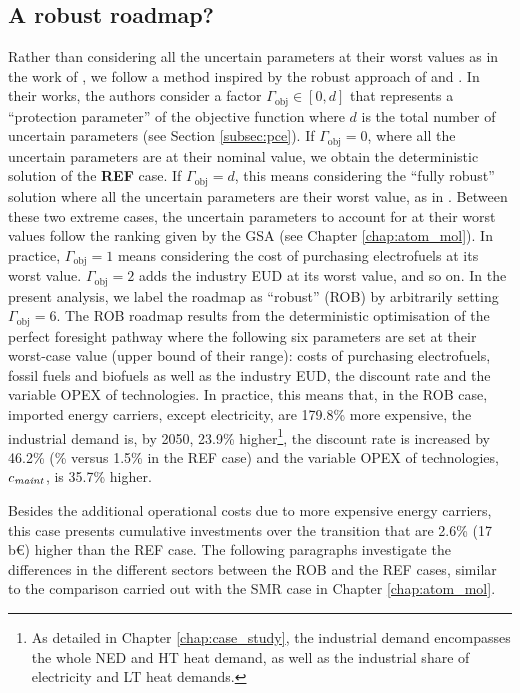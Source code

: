 \subsection{A robust roadmap?}
\label{subsec:RobPol:Rob_roadmap}
Rather than considering all the uncertain parameters at their worst values as in the work of \citet{soyster1973convex}, we follow a method inspired by the robust approach of \citet{bertsimas2004price} and \citet{Moret2017PhDThesis}. In their works, the authors consider a factor $\Gamma_{\text{obj}}\in [0,d]$ that represents a ``protection parameter'' of the objective function where $d$ is the total number of uncertain parameters (see Section \ref{subsec:pce}). If $\Gamma_{\text{obj}}= 0$, where all the uncertain parameters are at their nominal value, we obtain the deterministic solution of the \textbf{REF} case. If $\Gamma_{\text{obj}}= d$, this means considering the ``fully robust'' solution where all the uncertain parameters are their worst value, as in \citet{soyster1973convex}.  Between these two extreme cases, the uncertain parameters to account for at their worst values follow the ranking given by the \gls{GSA} (see Chapter \ref{chap:atom_mol}). In practice, $\Gamma_{\text{obj}}= 1$ means considering the cost of purchasing electrofuels at its worst value. $\Gamma_{\text{obj}}= 2$ adds the industry \gls{EUD} at its worst value, and so on. In the present analysis, we label the roadmap as ``robust'' (ROB) by arbitrarily setting $\Gamma_{\text{obj}}= 6$. The ROB roadmap results from the deterministic optimisation of the perfect foresight pathway where the following six parameters are set at their worst-case value (upper bound of their range): costs of purchasing electrofuels, fossil fuels and biofuels as well as the industry \gls{EUD}, the discount rate and the variable OPEX of technologies. In practice, this means that, in the ROB case, imported energy carriers, except electricity, are 179.8\% more expensive, the industrial demand is, by 2050, 23.9\% higher\footnote{As detailed in Chapter \ref{chap:case_study}, the industrial demand encompasses the whole \gls{NED} and \gls{HT} heat demand, as well as the industrial share of electricity and \gls{LT} heat demands.}, the discount rate is increased by 46.2\% (\% versus 1.5\% in the REF case) and the variable OPEX of technologies, $c_{\text{\emph{maint}}}$, is 35.7\% higher. 

Besides the additional operational costs due to more expensive energy carriers, this case presents cumulative investments over the transition that are 2.6\% (17\,b€) higher than the REF case. The following paragraphs investigate the differences in the different sectors between the ROB and the REF cases, similar to the comparison carried out with the SMR case in Chapter \ref{chap:atom_mol}.\\

